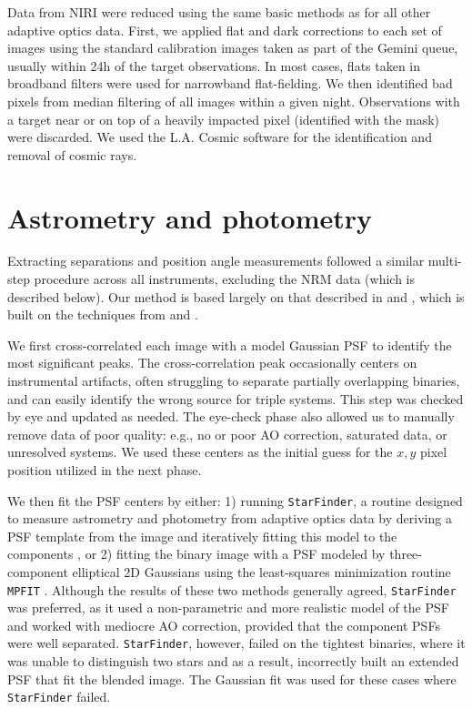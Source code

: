 \documentclass[twocolumn]{aastex62}
\begin{document}
Data from NIRI were reduced using the same basic methods as for all other adaptive optics data. First, we applied flat and dark corrections to each set of images using the standard calibration images taken as part of the Gemini queue, usually within 24h of the target observations. In most cases, flats taken in broadband filters were used for narrowband flat-fielding. We then identified bad pixels from median filtering of all images within a given night. Observations with a target near or on top of a heavily impacted pixel (identified with the mask) were discarded. We used the L.A. Cosmic software for the identification and removal of cosmic rays. 

\section{Astrometry and photometry}\label{sec:astrometry}

Extracting separations and position angle measurements followed a similar multi-step procedure across all instruments, excluding the NRM data (which is described below). Our method is based largely on that described in \citet{2016ApJ...817...80D} and \citet{Dupuy2017}, which is built on the techniques from \citet{2008ApJ...689..436L} and \citet{2010ApJ...721.1725D}.

We first cross-correlated each image with a model Gaussian PSF to identify the most significant peaks. The cross-correlation peak occasionally centers on instrumental artifacts, often struggling to separate partially overlapping binaries, and can easily identify the wrong source for triple systems. This step was checked by eye and updated as needed. The eye-check phase also allowed us to manually remove data of poor quality: e.g., no or poor AO correction, saturated data, or unresolved systems. We used these centers as the initial guess for the $x, y$ pixel position utilized in the next phase. 

We then fit the PSF centers by either: 1) running {\tt StarFinder}, a routine designed to measure astrometry and photometry from adaptive optics data by deriving a PSF template from the image and iteratively fitting this model to the components \citep[for more details, see][]{2000A&AS..147..335D}, or 2) fitting the binary image with a PSF modeled by three-component elliptical 2D Gaussians using the least-squares minimization routine {\tt MPFIT} \citep{Markwart2009}. Although the results of these two methods generally agreed, {\tt StarFinder} was preferred, as it used a non-parametric and more realistic model of the PSF and worked with mediocre AO correction, provided that the component PSFs were well separated. {\tt StarFinder}, however, failed on the tightest binaries, where it was unable to distinguish two stars and as a result, incorrectly built an extended PSF that fit the blended image. The Gaussian fit was used for these cases where {\tt StarFinder} failed. 
\end{document}
